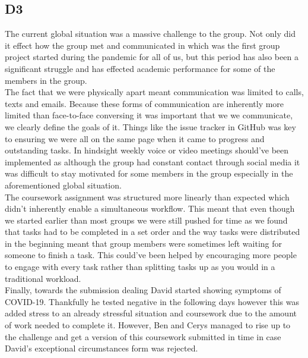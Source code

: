 \subsection*{D3}
    \hfill \break
    The current global situation was a massive challenge to the group. Not only did it effect how the group met and communicated in which was the first group project started during the pandemic for all of us, but this period has also been a significant struggle and has effected academic performance for some of the members in the group.\\
    
    The fact that we were physically apart meant communication was limited to calls, texts and emails. Because these forms of communication are inherently more limited than face-to-face conversing it was important that we we communicate, we clearly define the goals of it. Things like the issue tracker in GitHub was key to ensuring we were all on the same page when it came to progress and outstanding tasks. In hindsight weekly voice or video meetings should've been implemented as although the group had constant contact through social media it was difficult to stay motivated for some members in the group especially in the aforementioned global situation.\\
    
    The coursework assignment was structured more linearly than expected which didn't inherently enable a simultaneous workflow. This meant that even though we started earlier than most groups we were still pushed for time as we found that tasks had to be completed in a set order and the way tasks were distributed in the beginning meant that group members were sometimes left waiting for someone to finish a task. This could've been helped by encouraging more people to engage with every task rather than splitting tasks up as you would in a traditional workload.\\
    
    Finally, towards the submission dealing David started showing symptoms of COVID-19. Thankfully he tested negative in the following days however this was added stress to an already stressful situation and coursework due to the amount of work needed to complete it. However, Ben and Cerys managed to rise up to the challenge and get a version of this coursework submitted in time in case David's exceptional circumstances form was rejected.
